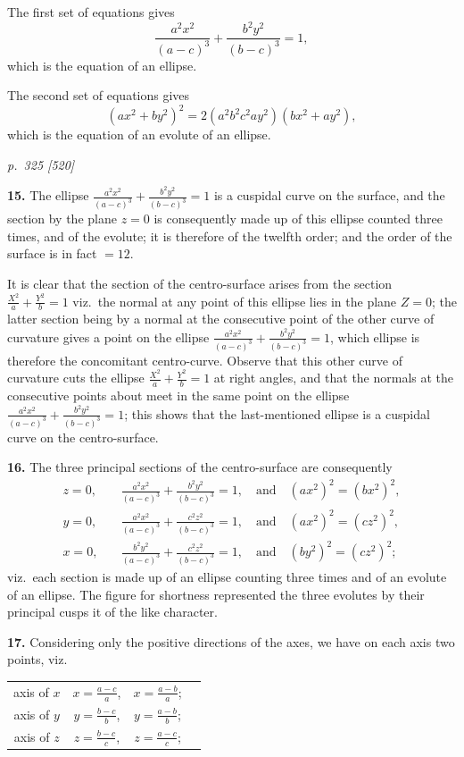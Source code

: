 \documentclass[11pt,a4paper]{article}
\theoremstyle{plain}
\theoremstyle{definition}
\begin{document}
The first set of equations gives
\[
\frac{a^2 x^2}{(a - c)^3} + \frac{b^2 y^2}{(b - c)^3} = 1,
\]
which is the equation of an ellipse.

The second set of equations gives
\[
(a x^2 + b y^2)^2 = 2(a^2 b^2 c^2 a y^2)(b x^2 + a y^2),
\]
which is the equation of an evolute of an ellipse.

\clearpage

\bigskip
\textit{p.~325 [520]}
\smallskip

\textbf{15.} The ellipse $\tfrac{a^2 x^2}{(a - c)^3} + \tfrac{b^2 y^2}{(b - c)^3} = 1$ is a cuspidal curve on the surface, and the section by the plane $z = 0$ is consequently made up of this ellipse counted three times, and of the evolute; it is therefore of the twelfth order; and the order of the surface is in fact $= 12$.

It is clear that the section of the centro-surface arises from the section $\tfrac{X^2}{a} + \tfrac{Y^2}{b} = 1$ viz.\ the normal at any point of this ellipse lies in the plane $Z = 0$; the latter section being by a normal at the consecutive point of the other curve of curvature gives a point on the ellipse $\tfrac{a^2 x^2}{(a - c)^3} + \tfrac{b^2 y^2}{(b - c)^3} = 1$, which ellipse is therefore the concomitant centro-curve. Observe that this other curve of curvature cuts the ellipse $\tfrac{X^2}{a} + \tfrac{Y^2}{b} = 1$ at right angles, and that the normals at the consecutive points about meet in the same point on the ellipse $\tfrac{a^2 x^2}{(a - c)^3} + \tfrac{b^2 y^2}{(b - c)^3} = 1$; this shows that the last-mentioned ellipse is a cuspidal curve on the centro-surface.

\textbf{16.} The three principal sections of the centro-surface are consequently
\begin{align*}
z = 0,\quad &\frac{a^2 x^2}{(a - c)^3} + \frac{b^2 y^2}{(b - c)^3} = 1,\quad\text{and}\quad (a x^2)^2 = (b x^2)^2,\\
y = 0,\quad &\frac{a^2 x^2}{(a - c)^3} + \frac{c^2 z^2}{(b - c)^3} = 1,\quad\text{and}\quad (a x^2)^2 = (c z^2)^2,\\
x = 0,\quad &\frac{b^2 y^2}{(a - c)^3} + \frac{c^2 z^2}{(b - c)^3} = 1,\quad\text{and}\quad (b y^2)^2 = (c z^2)^2;
\end{align*}
viz.\ each section is made up of an ellipse counting three times and of an evolute of an ellipse. The figure for shortness represented the three evolutes by their principal cusps it of the like character.

\textbf{17.} Considering only the positive directions of the axes, we have on each axis two points, viz.\
\begin{center}
\begin{tabular}{cccc}
axis of $x$ & $x = \tfrac{a - c}{a}$, & $x = \tfrac{a - b}{a}$;\\
axis of $y$ & $y = \tfrac{b - c}{b}$, & $y = \tfrac{a - b}{b}$;\\
axis of $z$ & $z = \tfrac{b - c}{c}$, & $z = \tfrac{a - c}{c}$;
\end{tabular}
\end{center}
\end{document}
